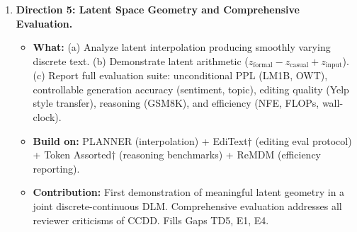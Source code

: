 \documentclass{article}
\begin{document}
\begin{enumerate}
    \item \textbf{Direction 5: Latent Space Geometry and Comprehensive Evaluation.}
    \begin{itemize}[nosep]
        \item \textbf{What:} (a) Analyze latent interpolation producing smoothly varying discrete text. (b) Demonstrate latent arithmetic ($z_\text{formal} - z_\text{casual} + z_\text{input}$). (c) Report full evaluation suite: unconditional PPL (LM1B, OWT), controllable generation accuracy (sentiment, topic), editing quality (Yelp style transfer), reasoning (GSM8K), and efficiency (NFE, FLOPs, wall-clock).
        \item \textbf{Build on:} PLANNER (interpolation) + EdiText$\dagger$ (editing eval protocol) + Token Assorted$\dagger$ (reasoning benchmarks) + ReMDM (efficiency reporting).
        \item \textbf{Contribution:} First demonstration of meaningful latent geometry in a joint discrete-continuous DLM. Comprehensive evaluation addresses all reviewer criticisms of CCDD. Fills Gaps TD5, E1, E4.
    \end{itemize}
\end{enumerate}
\end{document}
